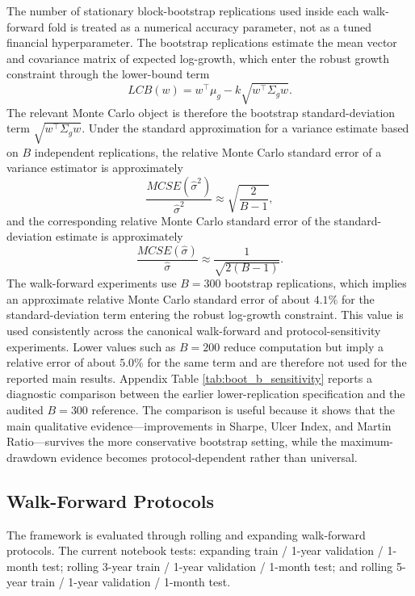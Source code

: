 \documentclass[11pt]{article}
\begin{document}
The number of stationary block-bootstrap replications used inside each walk-forward fold is treated as a numerical accuracy parameter, not as a tuned financial hyperparameter. The bootstrap replications estimate the mean vector and covariance matrix of expected log-growth, which enter the robust growth constraint through the lower-bound term
\begin{equation}
LCB(w)=w^\top \mu_g-k\sqrt{w^\top \Sigma_g w}.
\end{equation}
The relevant Monte Carlo object is therefore the bootstrap standard-deviation term $\sqrt{w^\top\Sigma_g w}$. Under the standard approximation for a variance estimate based on $B$ independent replications, the relative Monte Carlo standard error of a variance estimator is approximately
\begin{equation}
\frac{MCSE(\widehat{\sigma}^2)}{\widehat{\sigma}^2}\approx \sqrt{\frac{2}{B-1}},
\end{equation}
and the corresponding relative Monte Carlo standard error of the standard-deviation estimate is approximately
\begin{equation}
\frac{MCSE(\widehat{\sigma})}{\widehat{\sigma}}\approx \frac{1}{\sqrt{2(B-1)}}.
\end{equation}
The walk-forward experiments use $B=300$ bootstrap replications, which implies an approximate relative Monte Carlo standard error of about $4.1\%$ for the standard-deviation term entering the robust log-growth constraint. This value is used consistently across the canonical walk-forward and protocol-sensitivity experiments. Lower values such as $B=200$ reduce computation but imply a relative error of about $5.0\%$ for the same term and are therefore not used for the reported main results. Appendix Table \ref{tab:boot_b_sensitivity} reports a diagnostic comparison between the earlier lower-replication specification and the audited $B=300$ reference. The comparison is useful because it shows that the main qualitative evidence---improvements in Sharpe, Ulcer Index, and Martin Ratio---survives the more conservative bootstrap setting, while the maximum-drawdown evidence becomes protocol-dependent rather than universal.

\subsection{Walk-Forward Protocols}

The framework is evaluated through rolling and expanding walk-forward protocols. The current notebook tests: expanding train / 1-year validation / 1-month test; rolling 3-year train / 1-year validation / 1-month test; and rolling 5-year train / 1-year validation / 1-month test.
\end{document}
